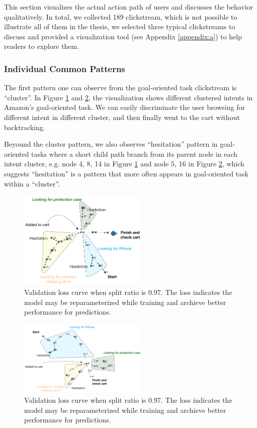 This section visualizes the actual action path of users and discusses the behavior qualitatively.
In total, we collected 189 clickstream, which is not possible to illustrate all of them
in the thesis, we selected three typical clickstreams to discuss and provided a visualization tool
(see Appendix \ref{appendix:a}) to help readers to explore them.

\subsubsection{Individual Common Patterns}

The first pattern one can observe from the goal-oriented task clickstream is ``cluster''.
In Figure \ref{fig:vis-goal1} and \ref{fig:vis-goal2}, the visualization shows different clustered intents in
Amazon's goal-oriented task. We can easily discriminate the user browsing for 
different intent in different cluster, and then finally went to the cart without
backtracking.

Beyound the cluster pattern, we also observes ``hesitation'' pattern in goal-oriented tasks
where a short child path branch from its parent node in each intent cluster, e.g. node
4, 8, 14 in Figure \ref{fig:vis-goal1} and node 5, 16 in Figure \ref{fig:vis-goal2},
which suggests ``hesitation'' is a pattern that more often appears in goal-oriented task
within a ``cluster''.

\begin{figure}
    \centering
    \includegraphics[width=0.55\textwidth]{figures/vis-goal1}
    \caption{Validation loss curve when split ratio is 0.97. The loss indicates
    the model may be reparameterized while training and archieve better performance
    for predictions.}
    \label{fig:vis-goal1}
\end{figure}

\begin{figure}
    \centering
    \includegraphics[width=0.55\textwidth]{figures/vis-goal2}
    \caption{Validation loss curve when split ratio is 0.97. The loss indicates
    the model may be reparameterized while training and archieve better performance
    for predictions.}
    \label{fig:vis-goal2}
\end{figure}


